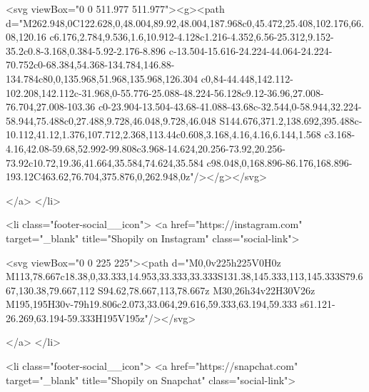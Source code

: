 {{{{{{{<svg viewBox="0 0 511.977 511.977"><g><path d="M262.948,0C122.628,0,48.004,89.92,48.004,187.968c0,45.472,25.408,102.176,66.08,120.16 c6.176,2.784,9.536,1.6,10.912-4.128c1.216-4.352,6.56-25.312,9.152-35.2c0.8-3.168,0.384-5.92-2.176-8.896 c-13.504-15.616-24.224-44.064-24.224-70.752c0-68.384,54.368-134.784,146.88-134.784c80,0,135.968,51.968,135.968,126.304 c0,84-44.448,142.112-102.208,142.112c-31.968,0-55.776-25.088-48.224-56.128c9.12-36.96,27.008-76.704,27.008-103.36 c0-23.904-13.504-43.68-41.088-43.68c-32.544,0-58.944,32.224-58.944,75.488c0,27.488,9.728,46.048,9.728,46.048 S144.676,371.2,138.692,395.488c-10.112,41.12,1.376,107.712,2.368,113.44c0.608,3.168,4.16,4.16,6.144,1.568 c3.168-4.16,42.08-59.68,52.992-99.808c3.968-14.624,20.256-73.92,20.256-73.92c10.72,19.36,41.664,35.584,74.624,35.584 c98.048,0,168.896-86.176,168.896-193.12C463.62,76.704,375.876,0,262.948,0z"/></g></svg>


        </a>
      </li>
    
    
    
<li class="footer-social__icon">
        <a href="https://instagram.com" target="_blank" title="Shopily on Instagram" class="social-link">
          
<svg viewBox="0 0 225 225"><path d="M0,0v225h225V0H0z M113,78.667c18.38,0,33.333,14.953,33.333,33.333S131.38,145.333,113,145.333S79.667,130.38,79.667,112 S94.62,78.667,113,78.667z M30,26h34v22H30V26z M195,195H30v-79h19.806c2.073,33.064,29.616,59.333,63.194,59.333 s61.121-26.269,63.194-59.333H195V195z"/></svg>


        </a>
      </li>
    
    
    
<li class="footer-social__icon">
        <a href="https://snapchat.com" target="_blank" title="Shopily on Snapchat" class="social-link">
          
}}}}}}}
